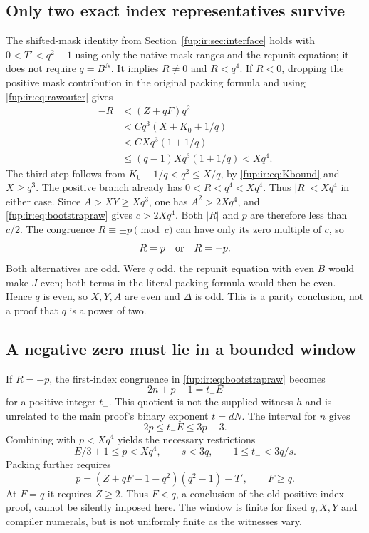 \documentclass[11pt,letterpaper]{article}
\theoremstyle{definition}\newtheorem{definition}[theorem]{Definition}
\theoremstyle{remark}\newtheorem{remark}[theorem]{Remark}
\begin{document}
\subsection{Only two exact index representatives survive}
The shifted-mask identity from Section~\ref{fup:ir:sec:interface} holds with $0<T'<q^2-1$ using only the native mask ranges and the repunit equation; it does not require $q=B^N$. It implies $R\ne0$ and $R<q^4$. If $R<0$, dropping the positive mask contribution in the original packing formula and using \eqref{fup:ir:eq:rawouter} gives
\begin{align*}
 -R&<(Z+qF)q^2\\
 &<Cq^3(X+K_0+1/q)\\
 &<CXq^3(1+1/q)\\
 &\le(q-1)Xq^3(1+1/q)<Xq^4.
\end{align*}
The third step follows from $K_0+1/q<q^2\le X/q$, by \eqref{fup:ir:eq:Kbound} and $X\ge q^3$. The positive branch already has $0<R<q^4<Xq^4$. Thus $|R|<Xq^4$ in either case. Since $A>XY\ge Xq^3$, one has $A^2>2Xq^4$, and \eqref{fup:ir:eq:bootstrapraw} gives $c>2Xq^4$. Both $|R|$ and $p$ are therefore less than $c/2$. The congruence $R\equiv\pm p\pmod c$ can have only its zero multiple of $c$, so
\begin{equation}\label{fup:ir:eq:exactsigned}
 R=p\quad\hbox{or}\quad R=-p.
\end{equation}
Both alternatives are odd. Were $q$ odd, the repunit equation with even $B$ would make $J$ even; both terms in the literal packing formula would then be even. Hence $q$ is even, so $X,Y,A$ are even and $\Delta$ is odd. This is a parity conclusion, not a proof that $q$ is a power of two.

\subsection{A negative zero must lie in a bounded window}
If $R=-p$, the first-index congruence in \eqref{fup:ir:eq:bootstrapraw} becomes
\[
 2n+p-1=t_-E
\]
for a positive integer $t_-$. This quotient is not the supplied witness $h$ and is unrelated to the main proof's binary exponent $t=dN$. The interval for $n$ gives
\[
 2p\le t_-E\le3p-3.
\]
Combining with $p<Xq^4$ yields the necessary restrictions
\begin{equation}\label{fup:ir:eq:negativewindow}
 E/3+1\le p<Xq^4,\qquad s<3q,\qquad1\le t_-<3q/s.
\end{equation}
Packing further requires
\[
 p=(Z+qF-1-q^2)(q^2-1)-T',\qquad F\ge q.
\]
At $F=q$ it requires $Z\ge2$. Thus $F<q$, a conclusion of the old positive-index proof, cannot be silently imposed here. The window is finite for fixed $q,X,Y$ and compiler numerals, but is not uniformly finite as the witnesses vary.
\end{document}
